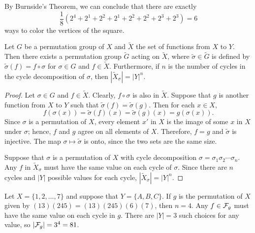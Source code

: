 By Burnside's Theorem, we can conclude that there are exactly
$$
\frac{1}{8} ( 2^4 + 2^1 + 2^2 + 2^1  + 2^2 + 2^2 +2^3 + 2^3)
= 6
$$
ways to color the vertices of the square.
 
 
\begin{proposition}
Let $G$ be a permutation group of $X$ and $\widetilde{X}$ the set of
functions from $X$ to $Y$. Then there exists a permutation group 
$\widetilde{G}$ acting on $\widetilde{X}$, where $\widetilde{\sigma} 
\in \widetilde{G}$ is defined by $\widetilde{\sigma}(f) = f \circ 
\sigma$ for $\sigma \in G$ and $f \in \widetilde{X}$. Furthermore, 
if $n$ is the number of cycles in the cycle decomposition 
of $\sigma$, then $|\widetilde{X}_{\sigma}| = |Y|^n$. 
\end{proposition}
 
 
\begin{proof}
Let $\sigma \in G$ and $f \in  \widetilde{X}$. Clearly, $f \circ
\sigma$ is also in $\widetilde{X}$. Suppose that $g$ is another
function from $X$ to $Y$ such that $\widetilde{\sigma}(f) =
\widetilde{\sigma}(g)$. Then for each $x \in X$,
$$
f( \sigma(x ))
= \widetilde{\sigma}(f)(x)
= \widetilde{\sigma}(g)(x)
= g( \sigma(x )).
$$
Since $\sigma$ is a permutation of $X$, every element $x'$ in $X$ is
the image of some $x$ in $X$ under $\sigma$; hence, $f$ and $g$ agree
on all elements of $X$. Therefore, $f=g$ and $\widetilde{\sigma}$ is
injective.  The map $\sigma \mapsto \widetilde{\sigma}$ is onto, since
the two sets are the same size.
 
 
Suppose that $\sigma$ is a permutation of $X$ with cycle decomposition
$\sigma = \sigma_1 \sigma_2 \cdots \sigma_n$. Any $f$ in
${\widetilde{X}}_{\sigma}$ must have the same value on each cycle of
$\sigma$. Since there are $n$ cycles and $|Y|$ possible values for
each cycle, $|{\widetilde{X}}_{\sigma}| = |Y|^n$.
\end{proof}
 
 
\medskip
 
 
\begin{example}
Let $X = \{1, 2, \ldots, 7\}$ and suppose that $Y = \{ A, B, C \}$. If
$g$ is the permutation of $X$ given by $(1 3)(2 4 5) = (1 3)(2 4
5)(6)(7)$, then $n = 4$. Any $f \in {\cal F}_g$ must have the same
value on each cycle in $g$. There are $|Y|=3$ such choices for any
value, so $|{\cal F}_g|  = 3^4 = 81$.
\end{example}
 
 
\vspace{ 2 ex}
 
